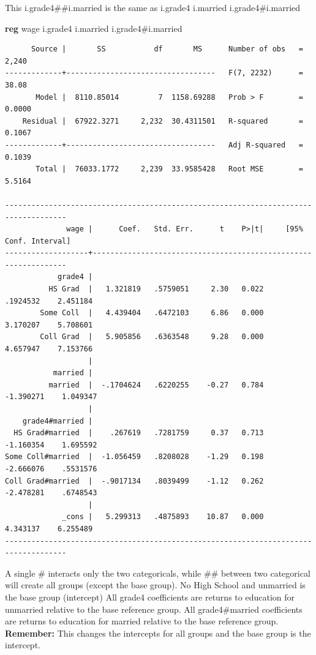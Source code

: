 \documentclass[
]{book}
\newenvironment{Shaded}{\begin{snugshade}}{\end{snugshade}}
\newcommand{\KeywordTok}[1]{\textcolor[rgb]{0.13,0.29,0.53}{\textbf{#1}}}
\newcommand{\NormalTok}[1]{#1}
\begin{document}
This i.grade4\#\#i.married is the same as i.grade4 i.married i.grade4\#i.married

\begin{Shaded}
\begin{Highlighting}[]
\KeywordTok{reg}\NormalTok{ wage i.grade4 i.married i.grade4\#i.married}
\end{Highlighting}
\end{Shaded}

\begin{verbatim}
      Source |       SS           df       MS      Number of obs   =     2,240
-------------+----------------------------------   F(7, 2232)      =     38.08
       Model |  8110.85014         7  1158.69288   Prob > F        =    0.0000
    Residual |  67922.3271     2,232  30.4311501   R-squared       =    0.1067
-------------+----------------------------------   Adj R-squared   =    0.1039
       Total |  76033.1772     2,239  33.9585428   Root MSE        =    5.5164

------------------------------------------------------------------------------------
              wage |      Coef.   Std. Err.      t    P>|t|     [95% Conf. Interval]
-------------------+----------------------------------------------------------------
            grade4 |
          HS Grad  |   1.321819   .5759051     2.30   0.022     .1924532    2.451184
        Some Coll  |   4.439404   .6472103     6.86   0.000     3.170207    5.708601
        Coll Grad  |   5.905856   .6363548     9.28   0.000     4.657947    7.153766
                   |
           married |
          married  |  -.1704624   .6220255    -0.27   0.784    -1.390271    1.049347
                   |
    grade4#married |
  HS Grad#married  |    .267619   .7281759     0.37   0.713    -1.160354    1.695592
Some Coll#married  |  -1.056459   .8208028    -1.29   0.198    -2.666076    .5531576
Coll Grad#married  |  -.9017134   .8039499    -1.12   0.262    -2.478281    .6748543
                   |
             _cons |   5.299313   .4875893    10.87   0.000     4.343137    6.255489
------------------------------------------------------------------------------------
\end{verbatim}

A single \# interacts only the two categoricals, while \#\# between two categorical will create all groups (except the base group).
No High School and unmarried is the base group (intercept)
All grade4 coefficients are returns to education for unmarried relative to the base reference group.
All grade4\#married coefficients are returns to education for married relative to the base reference group.
\textbf{Remember:} This changes the intercepts for all groups and the base group is the intercept.
\end{document}

